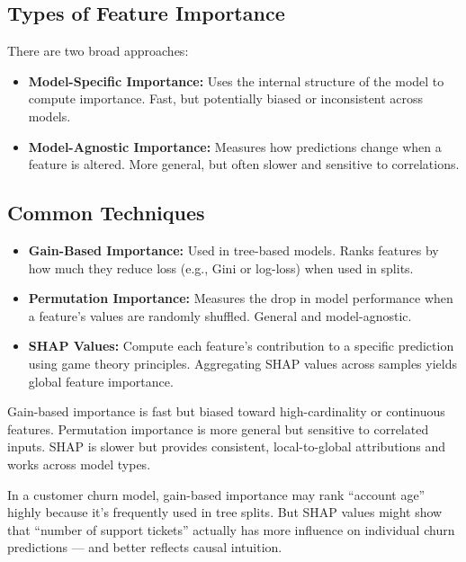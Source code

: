 \documentclass[12pt,openany, draft]{book}
\begin{document}
\subsection{Types of Feature Importance}

There are two broad approaches:

\begin{itemize}
    \item \textbf{Model-Specific Importance:} Uses the internal structure of the model to compute importance. Fast, but potentially biased or inconsistent across models.
    \item \textbf{Model-Agnostic Importance:} Measures how predictions change when a feature is altered. More general, but often slower and sensitive to correlations.
\end{itemize}


\subsection{Common Techniques}

\begin{itemize}
    \item \textbf{Gain-Based Importance:} Used in tree-based models. Ranks features by how much they reduce loss (e.g., Gini or log-loss) when used in splits.
    \item \textbf{Permutation Importance:} Measures the drop in model performance when a feature’s values are randomly shuffled. General and model-agnostic.
    \item \textbf{SHAP Values:} Compute each feature’s contribution to a specific prediction using game theory principles. Aggregating SHAP values across samples yields global feature importance.
\end{itemize}

\begin{notebox}
Gain-based importance is fast but biased toward high-cardinality or continuous features. Permutation importance is more general but sensitive to correlated inputs. SHAP is slower but provides consistent, local-to-global attributions and works across model types.
\end{notebox}

\begin{examplebox}
In a customer churn model, gain-based importance may rank ``account age'' highly because it's frequently used in tree splits. But SHAP values might show that ``number of support tickets'' actually has more influence on individual churn predictions — and better reflects causal intuition.
\end{examplebox}
\end{document}
